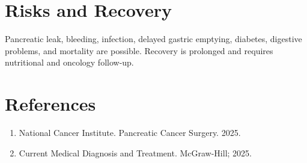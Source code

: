 \section*{Risks and Recovery}
Pancreatic leak, bleeding, infection, delayed gastric emptying, diabetes, digestive problems, and mortality are possible. Recovery is prolonged and requires nutritional and oncology follow-up.
\section*{References}
\begin{enumerate}\item National Cancer Institute. Pancreatic Cancer Surgery. 2025.\item Current Medical Diagnosis and Treatment. McGraw-Hill; 2025.\end{enumerate}
\clearpage
